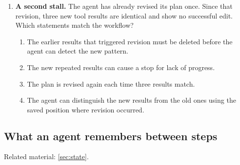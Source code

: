 \begin{enumerate}[start=1,itemsep=0.7\baselineskip]
\item\label{exercise:10} \begin{minipage}[t]{\linewidth}
\textbf{A second stall.} The agent has already revised its plan once. Since that revision, three new tool results are identical and show no successful edit. Which statements match the workflow?
\begin{enumerate}[label=\textnormal{(\Alph*)},leftmargin=*,itemsep=0pt]
\item The earlier results that triggered revision must be deleted before the agent can detect the new pattern.
\item The new repeated results can cause a stop for lack of progress.
\item The plan is revised again each time three results match.
\item The agent can distinguish the new results from the old ones using the saved position where revision occurred.
\end{enumerate}
\end{minipage}

\end{enumerate}

\subsection{What an agent remembers between steps}
\noindent Related material: \cref{sec:state}.

